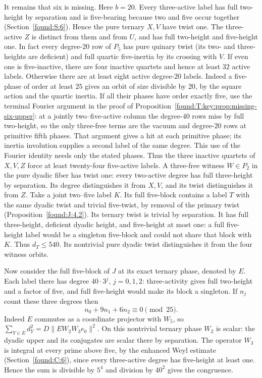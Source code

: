 \documentclass[11pt,a4paper]{article}
\numberwithin{equation}{section}
\theoremstyle{remark}
\begin{document}
It remains that six is missing. Here $b=20$. Every three-active label
has full two-height by separation and is five-bearing because two and five occur together (Section~\ref{found:S:6}). Hence the pure ternary $X,V$ have
twist one. The three-active $Z$ is distinct from them and from $U$,
and has full two-height and five-height one. In fact every degree-$20$
row of $P_5$ has pure quinary twist (its two- and three-heights are
deficient) and full quartic five-inertia by its crossing with $V$.
If even one is five-inactive, there are four inactive quartets and hence at least $32$ active labels. Otherwise there are at least eight active degree-$20$ labels.
Indeed a five-phase of order at least $25$ gives an orbit of size
divisible by $20$, by the square action and the quartic inertia. If all
their phases have order exactly five, use the terminal Fourier argument
in the proof of Proposition~\ref{found:T:key:prop:missing-six-upper}: at a jointly
two--five-active column the degree-$40$ rows miss by full two-height,
so the only three-free terms are the vacuum and degree-$20$ rows at
primitive fifth phases. That argument gives a hit at each primitive
phase; its inertia involution supplies a second label of the same
degree. This use of the Fourier identity needs only the stated phases.
Thus the three inactive quartets of $X,V,Z$ force at least twenty-four five-active labels. A three-free witness $W\in P_2$ in the pure dyadic fiber has twist one: every two-active degree has full three-height by separation. Its degree distinguishes it from $X,V$, and its twist distinguishes it from $Z$.
Take a joint two--five label $K$. Its full five-block contains
a label $T$ with the same dyadic twist and trivial five-twist, by removal of the primary twist (Proposition~\ref{found:J:4.2}). Its ternary twist is trivial by
separation. It has full three-height, deficient dyadic height, and
five-height at most one: a full five-height label would be a singleton
five-block and could not share that block with $K$. Thus $d_T\le540$.
Its nontrivial pure dyadic twist distinguishes it from the four witness orbits.

Now consider the full five-block of $J$ at its
exact ternary phase, denoted by $E$. Each label there has degree
$40\cdot3^j$, $j=0,1,2$: three-activity gives full two-height and
a factor of five, and full five-height would make its block a singleton.
If $n_j$ count these three degrees then
\[
             n_0+9n_1+6n_2\equiv0\pmod{25}.
\]
Indeed $E$ commutes as a coordinate projector with $W_5$, so
$\sum_{Y\in E}d_Y^2=D\|E W_2W_3 e_0\|^2$. On this nontrivial
ternary phase $W_2$ is scalar: the dyadic upper and its conjugates
are scalar there by separation. The operator $W_3$ is integral at every
prime above five, by the enhanced Weyl estimate (Section~\ref{found:C:6}), since
every three-active degree has five-height at least one. Hence the sum
is divisible by $5^4$ and division by $40^2$ gives the congruence.
\end{document}
